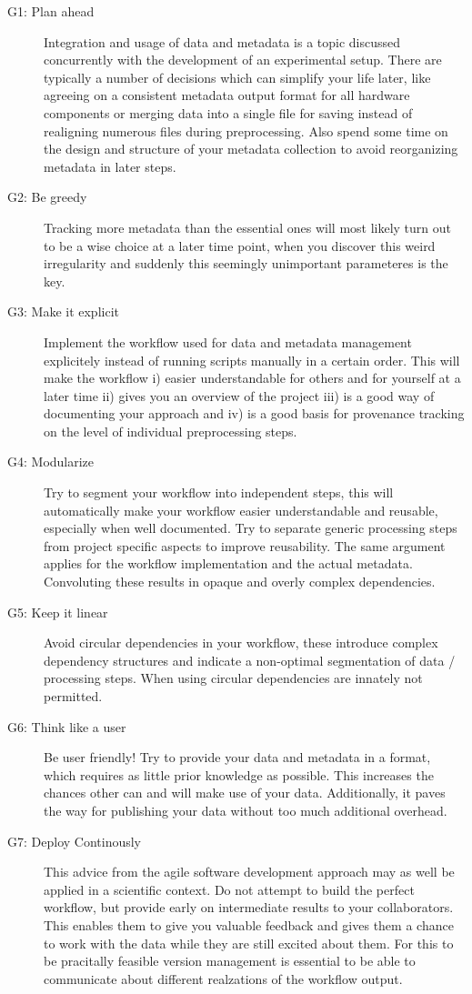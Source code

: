 \begin{description}
 \item[G1: Plan ahead] Integration and usage of data and metadata is a topic discussed concurrently with the development of an experimental setup. There are typically a number of decisions which can simplify your life later, like agreeing on a consistent metadata output format for all hardware components or merging data into a single file for saving instead of realigning numerous files during preprocessing. Also spend some time on the design and structure of your metadata collection to avoid reorganizing metadata in later steps.
 \item[G2: Be greedy] Tracking more metadata than the essential ones will most likely turn out to be a wise choice at a later time point, when you discover this weird irregularity and suddenly this seemingly unimportant parameteres is the key.
 \item[G3: Make it explicit] Implement the workflow used for data and metadata management explicitely instead of running scripts manually in a certain order. This will make the workflow i) easier understandable for others and for yourself at a later time ii) gives you an overview of the project iii) is a good way of documenting your approach and iv) is a good basis for provenance tracking on the level of individual preprocessing steps.
 \item[G4: Modularize] Try to segment your workflow into independent steps, this will automatically make your workflow easier understandable and reusable, especially when well documented. Try to separate generic processing steps from project specific aspects to improve reusability. The same argument applies for the workflow implementation and the actual metadata. Convoluting these results in opaque and overly complex dependencies.
 \item[G5: Keep it linear] Avoid circular dependencies in your workflow, these introduce complex dependency structures and indicate a non-optimal segmentation of data / processing steps. When using  circular dependencies are innately not permitted.
 \item[G6: Think like a user] Be user friendly! Try to provide your data and metadata in a format, which requires as little prior knowledge as possible. This increases the chances other can and will make use of your data. Additionally, it paves the way for publishing your data without too much additional overhead.
 \item[G7: Deploy Continously] This advice from the agile software development approach may as well be applied in a scientific context. Do not attempt to build the perfect workflow, but provide early on intermediate results to your collaborators. This enables them to give you valuable feedback and gives them a chance to work with the data while they are still excited about them. For this to be pracitally feasible version management is essential to be able to communicate about different realzations of the workflow output.
\end{description}
